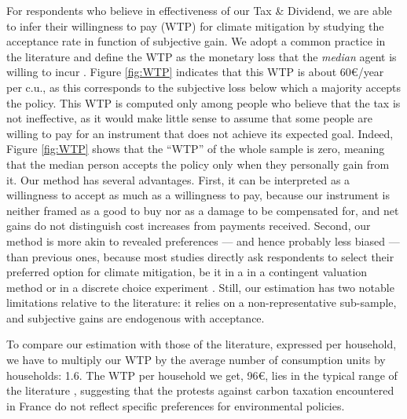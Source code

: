 \documentclass[11pt]{article}
\begin{document}
\begin{appendices}
For respondents who believe in effectiveness of our Tax \& Dividend, we are able to infer their willingness to pay (WTP) for climate mitigation by studying the acceptance rate in function of subjective gain. We adopt a common practice in the literature and define the WTP as the monetary loss that the \textit{median} agent is willing to incur \citep{hanemann_welfare_1984}. Figure \ref{fig:WTP} indicates that this WTP is about 60\euro{}/year per c.u., as this corresponds to the subjective loss below which a majority accepts the policy. This WTP is computed only among people who believe that the tax is not ineffective, as it would make little sense to assume that some people are willing to pay for an instrument that does not achieve its expected goal. Indeed, Figure \ref{fig:WTP} shows that the ``WTP'' of the whole sample is zero, meaning that the median person accepts the policy only when they personally gain from it. Our method has several advantages. First, it can be interpreted as a willingness to accept as much as a willingness to pay, because our instrument is neither framed as a good to buy nor as a damage to be compensated for, and net gains do not distinguish cost increases from payments received. Second, our method is more akin to revealed preferences --- and hence probably less biased \citep{murphy_meta-analysis_2005} --- than previous ones, because most studies directly ask respondents to select their preferred option for climate mitigation, be it in a in a contingent valuation method \citep{berrens_information_2004,cameron_individual_2005,kotchen_willingness--pay_2013} or in a discrete choice experiment \citep{longo_internalization_2008,alberini_preferences_2018}. Still, our estimation has two notable limitations relative to the literature: it relies on a non-representative sub-sample, and subjective gains are endogenous with acceptance. 

To compare our estimation with those of the literature, expressed per household, we have to multiply our WTP by the average number of consumption units by households: 1.6. The WTP per household we get, 96\euro{}, lies in the typical range of the literature \citep{jenkins_political_2014,streimikiene_review_2019}, suggesting that the protests against carbon taxation encountered in France do not reflect specific preferences for environmental policies.


\end{appendices}
\end{document}
